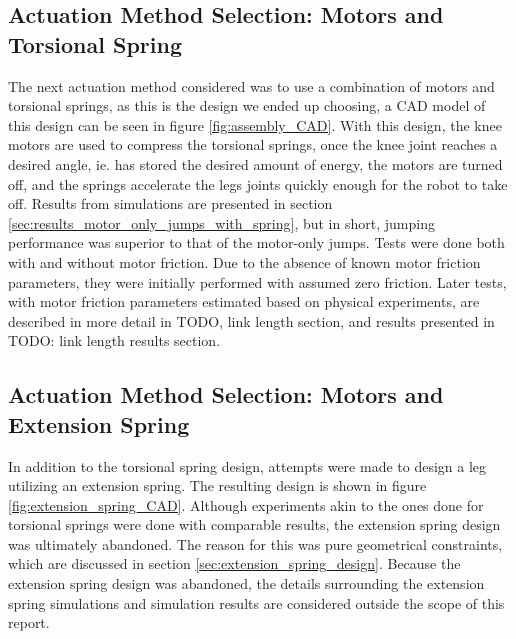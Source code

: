 \subsection{Actuation Method Selection: Motors and Torsional Spring}

The next actuation method considered was to use a combination of motors and torsional springs, as this is the design we ended up choosing, a CAD model of this design can be seen in figure \ref{fig:assembly_CAD}. With this design, the knee motors are used to compress the torsional springs, once the knee joint reaches a desired angle, ie. has stored the desired amount of energy, the motors are turned off, and the springs accelerate the legs joints quickly enough for the robot to take off. Results from simulations are presented in section \ref{sec:results_motor_only_jumps_with_spring}, but in short, jumping performance was superior to that of the motor-only jumps. Tests were done both with and without motor friction. Due to the absence of known motor friction parameters, they were initially performed with assumed zero friction. Later tests, with motor friction parameters estimated based on physical experiments, are described in more detail in TODO, link length section, and results presented in TODO: link length results section. 


\subsection{Actuation Method Selection: Motors and Extension Spring}

In addition to the torsional spring design, attempts were made to design a leg utilizing an extension spring. The resulting design is shown in figure \ref{fig:extension_spring_CAD}. Although experiments akin to the ones done for torsional springs were done with comparable results, the extension spring design was ultimately abandoned. The reason for this was pure geometrical constraints, which are discussed in section \ref{sec:extension_spring_design}. Because the extension spring design was abandoned, the details surrounding the extension spring simulations and simulation results are considered outside the scope of this report.

